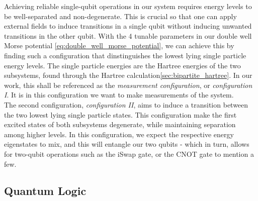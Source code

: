 \documentclass{subfiles}
\begin{document}
Achieving reliable single-qubit operations in our system requires energy levels to be well-separated and non-degenerate. This is crucial so that one can apply external fields to induce transitions in a single qubit without inducing unwanted transitions in the other qubit. With the 4 tunable parameters in our double well Morse potential \eqref{eq:double_well_morse_potential}, we can achieve this by finding such a configuration that dinstinguishes the lowest lying single particle energy levels. The single particle energies are the Hartree energies of the two subsystems, found through the Hartree calculation\ref{sec:bipartite_hartree}. In our work, this shall be referenced as the \emph{measurement configuration}, or \emph{configuration I}. It is in this configuration we want to make measurements of the system. 
\\ 

The second configuration, \emph{configuration II}, aims to induce a transition between the two lowest lying single particle states. This configuration make the first excited states of both subsystems degenerate, while maintaining separation among higher levels. In this configuration, we expect the respective energy eigenstates to mix, and this will entangle our two qubits - which in turn, allows for two-qubit operations such as the iSwap gate, or the CNOT gate to mention a few\cite{leinonen2024coulomb, nichol2017high}.
\subsection{Quantum Logic}
\end{document}
